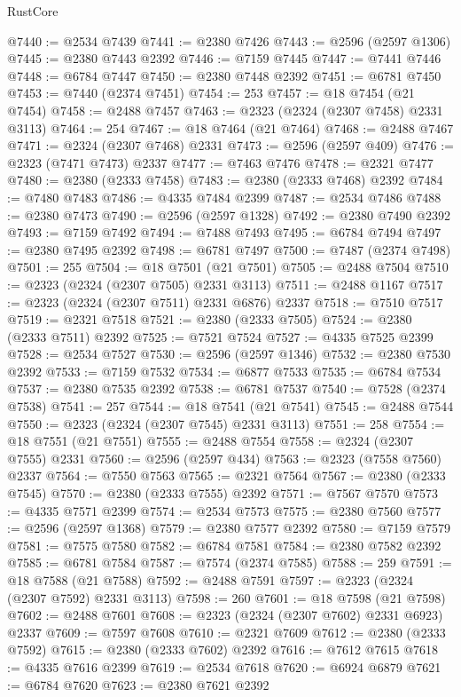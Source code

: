 \begin{lexlean}{RustCore}
\begin{coremodule}
@7440 := @2534 @7439
@7441 := @2380 @7426
@7443 := @2596 (@2597 @1306)
@7445 := @2380 @7443 @2392
@7446 := @7159 @7445
@7447 := @7441 @7446
@7448 := @6784 @7447
@7450 := @2380 @7448 @2392
@7451 := @6781 @7450
@7453 := @7440 (@2374 @7451)
@7454 := 253
@7457 := @18 @7454 (@21 @7454)
@7458 := @2488 @7457
@7463 := @2323 (@2324 (@2307 @7458) @2331 @3113)
@7464 := 254
@7467 := @18 @7464 (@21 @7464)
@7468 := @2488 @7467
@7471 := @2324 (@2307 @7468) @2331
@7473 := @2596 (@2597 @409)
@7476 := @2323 (@7471 @7473) @2337
@7477 := @7463 @7476
@7478 := @2321 @7477
@7480 := @2380 (@2333 @7458)
@7483 := @2380 (@2333 @7468) @2392
@7484 := @7480 @7483
@7486 := @4335 @7484 @2399
@7487 := @2534 @7486
@7488 := @2380 @7473
@7490 := @2596 (@2597 @1328)
@7492 := @2380 @7490 @2392
@7493 := @7159 @7492
@7494 := @7488 @7493
@7495 := @6784 @7494
@7497 := @2380 @7495 @2392
@7498 := @6781 @7497
@7500 := @7487 (@2374 @7498)
@7501 := 255
@7504 := @18 @7501 (@21 @7501)
@7505 := @2488 @7504
@7510 := @2323 (@2324 (@2307 @7505) @2331 @3113)
@7511 := @2488 @1167
@7517 := @2323 (@2324 (@2307 @7511) @2331 @6876) @2337
@7518 := @7510 @7517
@7519 := @2321 @7518
@7521 := @2380 (@2333 @7505)
@7524 := @2380 (@2333 @7511) @2392
@7525 := @7521 @7524
@7527 := @4335 @7525 @2399
@7528 := @2534 @7527
@7530 := @2596 (@2597 @1346)
@7532 := @2380 @7530 @2392
@7533 := @7159 @7532
@7534 := @6877 @7533
@7535 := @6784 @7534
@7537 := @2380 @7535 @2392
@7538 := @6781 @7537
@7540 := @7528 (@2374 @7538)
@7541 := 257
@7544 := @18 @7541 (@21 @7541)
@7545 := @2488 @7544
@7550 := @2323 (@2324 (@2307 @7545) @2331 @3113)
@7551 := 258
@7554 := @18 @7551 (@21 @7551)
@7555 := @2488 @7554
@7558 := @2324 (@2307 @7555) @2331
@7560 := @2596 (@2597 @434)
@7563 := @2323 (@7558 @7560) @2337
@7564 := @7550 @7563
@7565 := @2321 @7564
@7567 := @2380 (@2333 @7545)
@7570 := @2380 (@2333 @7555) @2392
@7571 := @7567 @7570
@7573 := @4335 @7571 @2399
@7574 := @2534 @7573
@7575 := @2380 @7560
@7577 := @2596 (@2597 @1368)
@7579 := @2380 @7577 @2392
@7580 := @7159 @7579
@7581 := @7575 @7580
@7582 := @6784 @7581
@7584 := @2380 @7582 @2392
@7585 := @6781 @7584
@7587 := @7574 (@2374 @7585)
@7588 := 259
@7591 := @18 @7588 (@21 @7588)
@7592 := @2488 @7591
@7597 := @2323 (@2324 (@2307 @7592) @2331 @3113)
@7598 := 260
@7601 := @18 @7598 (@21 @7598)
@7602 := @2488 @7601
@7608 := @2323 (@2324 (@2307 @7602) @2331 @6923) @2337
@7609 := @7597 @7608
@7610 := @2321 @7609
@7612 := @2380 (@2333 @7592)
@7615 := @2380 (@2333 @7602) @2392
@7616 := @7612 @7615
@7618 := @4335 @7616 @2399
@7619 := @2534 @7618
@7620 := @6924 @6879
@7621 := @6784 @7620
@7623 := @2380 @7621 @2392

\end{coremodule}
\end{lexlean}

